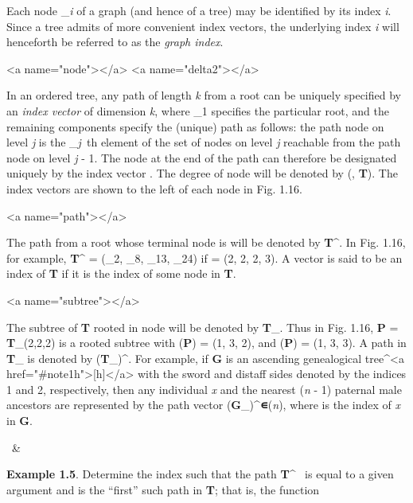 {\par Each node _{\textit{i}} of a graph (and hence of a tree) may be identified by its index \textit{i}. Since a tree admits of more convenient index vectors, the underlying index \textit{i} will henceforth be referred to as the \textit{graph index}.

<a name="node"></a>
<a name="delta2"></a>
\par In an ordered tree, any path of length \textit{k} from a root can be uniquely specified by an \textit{index vector}  of dimension \textit{k}, where _{1} specifies the particular root, and the remaining components specify the (unique) path as follows: the path node on level \textit{j} is the _{\textit{j\ }}th element of the set of nodes on level \textit{j} reachable from the path node on level \textit{j} - 1. The node at the end of the path can therefore be designated uniquely by the index vector . The degree of node  will be denoted by \textit{\delta}(, \textbf{T}). The index vectors are shown to the left of each node in Fig. 1.16.

<a name="path"></a>
\par The path from a root whose terminal node is  will be denoted by \textbf{T}^{}. In Fig. 1.16, for example, 
\textbf{T}^{} = 
(_{2}, 
_{8}, 
_{13}, 
_{24}) if  = (2, 2, 2, 3). A vector  is said to be an index of \textbf{T} if it is the index of some node in \textbf{T}.

<a name="subtree"></a>
\par The subtree of \textbf{T} rooted in node  will be denoted by \textbf{T}_{}. Thus in Fig. 1.16, 
\textbf{P} = \textbf{T}_{(2,2,2)} is a rooted subtree with \textbf{\nu}(\textbf{P}) = 
(1, 3, 2), and 
\textbf{\mu}(\textbf{P}) = (1, 3, 3). A path in \textbf{T}_{} is denoted by (\textbf{T}_{})^{}. For example, if \textbf{G} is an ascending genealogical tree^{<a href="#note1h">[h]</a>} with the sword and distaff sides denoted by the indices 1 and 2, respectively, then any individual \textit{x} and the nearest (\textit{n} - 1) paternal male ancestors are represented by the path vector (\textbf{G}_{})^{\textbf{∊}(\textit{n})}, where  is the index of \textit{x} in \textbf{G}.

\begin{tabularx}\ & 
\par \textbf{Example 1.5}. Determine the index  such that the path \textbf{T}^{\ } is equal to a given argument  and is the ``first'' such path in \textbf{T}; that is, the function


\end{tabularx}}
